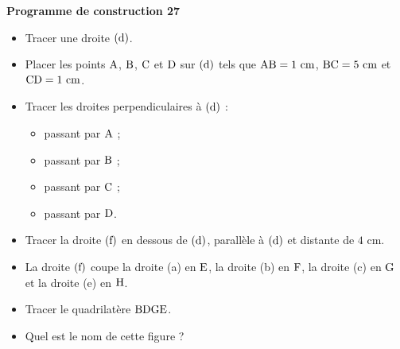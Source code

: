 \documentclass[exercice,a4]{thedocument}%
\begin{document}
%
\noindent\textbf{Programme de construction 27}\par\smallskip\noindent
\begin{itemize}
    \item Tracer une droite $(\text{d})$.
    \item Placer les points $\text{A}$, $\text{B}$,
    $\text{C}$ et $\text{D}$ sur $(\text{d})$ tels que
    $\text{AB}=1\text{ cm}$, $\text{BC}=5\text{ cm}$ et
    $\text{CD}=1\text{ cm}$.
    \item Tracer les droites perpendiculaires à $(\text{d})$ :
    \begin{itemize}
        \item[(a)] passant par $\text{A}$ ;
        \item[(b)] passant par $\text{B}$ ;
        \item[(c)] passant par $\text{C}$ ;
        \item[(e)] passant par $\text{D}$.
    \end{itemize}
    \item Tracer la droite $(\text{f})$ en dessous de
    $(\text{d})$, parallèle à $(\text{d})$ et distante de
    $4\text{ cm}$.
    \item La droite $(\text{f})$ coupe la droite (a) en
    $\text{E}$, la droite (b) en $\text{F}$, la droite (c) en
    $\text{G}$ et la droite (e) en $\text{H}$.
    \item Tracer le quadrilatère $\text{BDGE}$.
    \item Quel est le nom de cette figure ?
\end{itemize}
\end{document}
